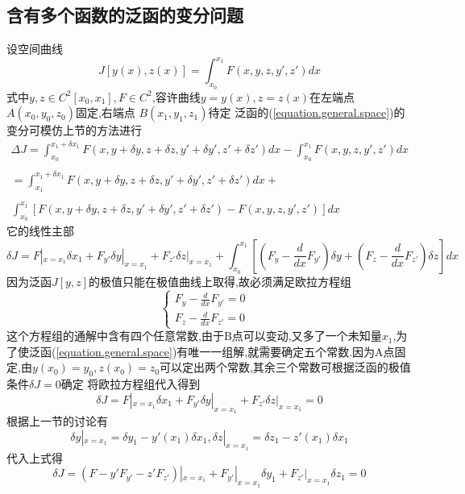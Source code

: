 \subsection{含有多个函数的泛函的变分问题}
设空间曲线
\begin{equation}
J[y(x),z(x)]=\int_{x_0}^{x_1}F(x,y,z,y',z')dx
\label{equation.general.space}
\end{equation}
式中$y,z \in C^2[x_0,x_1],F \in C^2$,容许曲线$y=y(x),z=z(x)$在左端点
$A(x_0,y_0,z_0)$固定,右端点 $B(x_1,y_1,z_1)$待定
泛函的(\ref{equation.general.space})的变分可模仿上节的方法进行
\begin{equation}
\begin{array}{c}
  \Delta J=\int_{x_0}^{x_1+\delta x_1}F(x,y+\delta y,z+\delta z,y'+\delta y',z'+\delta z')dx-\int_{x_0}^{x_1}F(x,y,z,y',z')dx\\
\\
  = \int_{x_1}^{x_1+\delta x_1}F(x,y+\delta y,z+\delta z,y'+\delta y',z'+\delta z')dx +\\
\\
\int_{x_0}^{x_1}[F(x,y+\delta y,z+\delta z,y'+\delta y',z'+\delta z')-F(x,y,z,y',z')]dx
\end{array}
\end{equation}
它的线性主部
\begin{equation}
 \delta J=F|_{x=x_1}\delta x_1 +F_{y'}\delta y|_{x=x_1} +F_{z'}\delta z|_{x=x_1} +
 \int_{x_0}^{x_1}[(F_y - \frac{d}{dx}F_{y'}) \delta y +(F_z -\frac{d}{dx}F_{z'} )\delta z]dx
\end{equation}
因为泛函$J[y,z]$的极值只能在极值曲线上取得,故必须满足欧拉方程组
$$
\left\{
  \begin{array}{ll}
    F_y - \frac{d}{dx}F_{y'}=0 & \\
    F_z - \frac{d}{dx}F_{z'}=0 &
  \end{array}
\right.
$$
这个方程组的通解中含有四个任意常数,由于B点可以变动,又多了一个未知量$x_1$,为了使泛函(\ref{equation.general.space})有唯一一组解,就需要确定五个常数.因为A点固定,由$y(x_0)=y_0,z(x_0)=z_0$可以定出两个常数,其余三个常数可根据泛函的极值条件$\delta J=0$确定
将欧拉方程组代入得到
\begin{equation}
 \delta J=F|_{x=x_1}\delta x_1 +F_{y'}\delta y|_{x=x_1} +F_{z'}\delta z|_{x=x_1}=0
\end{equation}
根据上一节的讨论有
\begin{equation}
 \delta y|_{x=x_1}=\delta y_1 - y'(x_1)\delta x_1, \delta z|_{x=x_1}=\delta z_1 - z'(x_1)\delta x_1
\end{equation}
代入上式得
\begin{equation}
 \delta J=(F - y'F_{y'} - z'F_{z'})|_{x=x_1} + F_{y'}|_{x=x_1}\delta y_1 + F_{z'}|_{x=x_1}\delta z_1=0
\label{equation.cases}
\end{equation}
